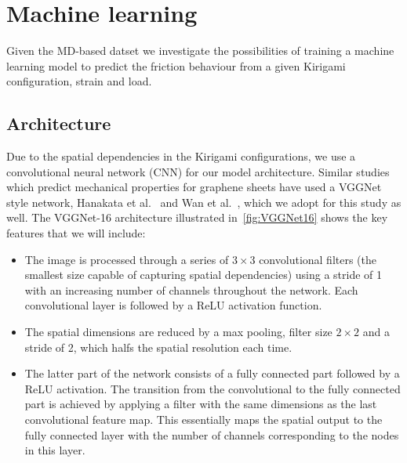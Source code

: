 \section{Machine learning}


Given the \acrshort{MD}-based datset we investigate the possibilities of training a machine learning model to predict the friction behaviour from a given Kirigami configuration, strain and load. 




\subsection{Architecture}
Due to the spatial dependencies in the Kirigami configurations, we use a convolutional neural network (\acrshort{CNN}) for our model architecture. Similar studies which predict mechanical properties for graphene sheets have used a VGGNet style network, Hanakata et al.~\cite{PhysRevLett.121.255304, PhysRevResearch.2.042006} and Wan et al.~\cite{graphene/hBN}, which we adopt for this study as well. The VGGNet-16 architecture illustrated in~\cref{fig:VGGNet16} shows the key features that we will include:
\begin{itemize}
  \item The image is processed through a series of $3 \times 3$ convolutional filters (the smallest size capable of capturing spatial dependencies) using a stride of 1 with an increasing number of channels throughout the network. Each convolutional layer is followed by a ReLU activation function. 
  \item The spatial dimensions are reduced by a max pooling, filter size $2 \times 2$ and a stride of 2, which halfs the spatial resolution each time. 
  \item The latter part of the network consists of a fully connected part followed by a ReLU activation. The transition from the convolutional to the fully connected part is achieved by applying a filter with the same dimensions as the last convolutional feature map. This essentially maps the spatial output to the fully connected layer with the number of channels corresponding to the nodes in this layer.
\end{itemize}

